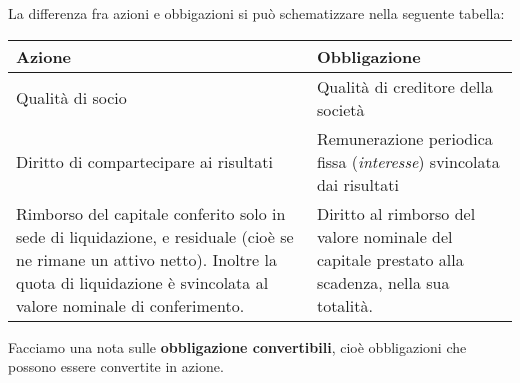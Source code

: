 \documentclass[a4paper,11pt]{article}
\begin{document}
La differenza fra azioni e obbigazioni si può schematizzare nella seguente tabella:

\begin{table}[H]
	\center {}
	\begin{tabular} {p{7cm} | p{7cm}}
		\bfseries Azione & \bfseries Obbligazione \\
		\hline 
		Qualità di socio & Qualità di creditore della società \\
		Diritto di compartecipare ai risultati & Remunerazione periodica fissa (\textit{interesse}) svincolata dai risultati \\
		Rimborso del capitale conferito solo in sede di liquidazione, e residuale (cioè se ne rimane un attivo netto). Inoltre la quota di liquidazione è svincolata al valore nominale di conferimento. & Diritto al rimborso del valore nominale del capitale prestato alla scadenza, nella sua totalità. \\
	\end{tabular}
\end{table}

Facciamo una nota sulle \textbf{obbligazione convertibili}, cioè obbligazioni che possono essere convertite in azione.
\end{document}
